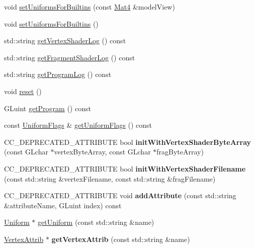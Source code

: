 \begin{DoxyCompactItemize}
\item 
void \hyperlink{classGLProgram_a62b6c142c96d7286e5d465e0163947ba}{set\+Uniforms\+For\+Builtins} (const \hyperlink{classMat4}{Mat4} \&model\+View)
\item 
void \hyperlink{classGLProgram_af8f90606d2bffb6418a67195cb9ddc7d}{set\+Uniforms\+For\+Builtins} ()
\item 
std\+::string \hyperlink{classGLProgram_a82407faaa31b7bd933ba1bc870d62108}{get\+Vertex\+Shader\+Log} () const
\item 
std\+::string \hyperlink{classGLProgram_ac5715fdba2b5cde51888dba2faaa4ab8}{get\+Fragment\+Shader\+Log} () const
\item 
std\+::string \hyperlink{classGLProgram_a1397791d58a20f927a5e101b20646d22}{get\+Program\+Log} () const
\item 
void \hyperlink{classGLProgram_a457db5fbd837470d94157e4a0a525859}{reset} ()
\item 
G\+Luint \hyperlink{classGLProgram_a02a4cfcbcf881d3f6c83dac6861e6743}{get\+Program} () const
\item 
const \hyperlink{structGLProgram_1_1UniformFlags}{Uniform\+Flags} \& \hyperlink{classGLProgram_a809306485fbc3534053138ec531dbc97}{get\+Uniform\+Flags} () const
\item 
\mbox{\label{classGLProgram_ab05fdc80af71469c8ddc498fbffa9217}} 
C\+C\+\_\+\+D\+E\+P\+R\+E\+C\+A\+T\+E\+D\+\_\+\+A\+T\+T\+R\+I\+B\+U\+TE bool {\bfseries init\+With\+Vertex\+Shader\+Byte\+Array} (const G\+Lchar $\ast$vertex\+Byte\+Array, const G\+Lchar $\ast$frag\+Byte\+Array)
\item 
\mbox{\label{classGLProgram_ad60a2b677ad372d05537f8a0886d09e9}} 
C\+C\+\_\+\+D\+E\+P\+R\+E\+C\+A\+T\+E\+D\+\_\+\+A\+T\+T\+R\+I\+B\+U\+TE bool {\bfseries init\+With\+Vertex\+Shader\+Filename} (const std\+::string \&vertex\+Filename, const std\+::string \&frag\+Filename)
\item 
\mbox{\label{classGLProgram_a87ddcb95242ae7ca4a34f18025618400}} 
C\+C\+\_\+\+D\+E\+P\+R\+E\+C\+A\+T\+E\+D\+\_\+\+A\+T\+T\+R\+I\+B\+U\+TE void {\bfseries add\+Attribute} (const std\+::string \&attribute\+Name, G\+Luint index) const
\end{DoxyCompactItemize}
\textbf{ }\par
\begin{DoxyCompactItemize}
\item 
\hyperlink{structUniform}{Uniform} $\ast$ \hyperlink{classGLProgram_ad22023040928ac3f82fc1b36ce31e995}{get\+Uniform} (const std\+::string \&name)
\item 
\mbox{\label{classGLProgram_a9be181d6448aa412bc71898a84215bd5}} 
\hyperlink{structVertexAttrib}{Vertex\+Attrib} $\ast$ {\bfseries get\+Vertex\+Attrib} (const std\+::string \&name)
\end{DoxyCompactItemize}

